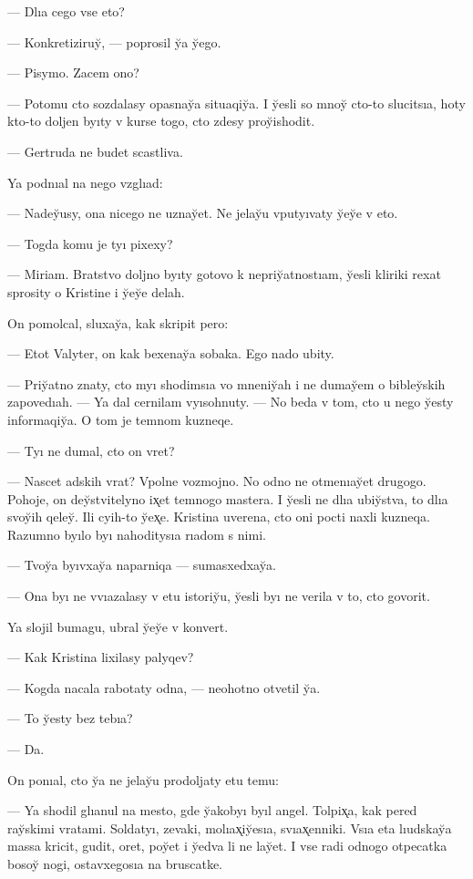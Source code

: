 \documentclass[10pt]{book}
\begin{document}
— Dlıa cego vse eto?

— Konkretiziruy̆, — poprosil y̆a y̆ego.

— Pisymo. Zacem ono?

— Potomu cto sozdalasy opasnay̆a situaqiy̆a. I y̆esli so mnoy̆ cto-to slucitsıa, hoty kto-to doljen byıty v kurse togo, cto zdesy proy̆ishodit.

— Gertruda ne budet scastliva.

Ya podnıal na nego vzglıad:

— Nadey̆usy, ona nicego ne uznay̆et. Ne jelay̆u vputyıvaty y̆ey̆e v eto.

— Togda komu je tyı pixexy?

— Miriam. Bratstvo doljno byıty gotovo k nepriy̆atnostıam, y̆esli kliriki rexat sprosity o Kristine i y̆ey̆e delah.

On pomolcal, sluxay̆a, kak skripit pero:

— Etot Valyter, on kak bexenay̆a sobaka. Ego nado ubity.

— Priy̆atno znaty, cto myı shodimsıa vo mneniy̆ah i ne dumay̆em o bibley̆skih zapovedıah. — Ya dal cernilam vyısohnuty. — No beda v tom, cto u nego y̆esty informaqiy̆a. O tom je temnom kuzneqe.

— Tyı ne dumal, cto on vret?

— Nascet adskih vrat? Vpolne vozmojno. No odno ne otmenıay̆et drugogo. Pohoje, on dey̆stvitelyno ix̨et temnogo mastera. I y̆esli ne dlıa ubiy̆stva, to dlıa svoy̆ih qeley̆. Ili cyih-to y̆ex̨e. Kristina uverena, cto oni pocti naxli kuzneqa. Razumno byılo byı nahoditysıa rıadom s nimi.

— Tvoy̆a byıvxay̆a naparniqa — sumasxedxay̆a.

— Ona byı ne vvıazalasy v etu istoriy̆u, y̆esli byı ne verila v to, cto govorit.

Ya slojil bumagu, ubral y̆ey̆e v konvert.

— Kak Kristina lixilasy palyqev?

— Kogda nacala rabotaty odna, — neohotno otvetil y̆a.

— To y̆esty bez tebıa?

— Da.

On ponıal, cto y̆a ne jelay̆u prodoljaty etu temu:

— Ya shodil glıanul na mesto, gde y̆akobyı byıl angel. Tolpix̨a, kak pered ray̆skimi vratami. Soldatyı, zevaki, molıax̨iy̆esıa, svıax̨enniki. Vsıa eta lıudskay̆a massa kricit, gudit, oret, poy̆et i y̆edva li ne lay̆et. I vse radi odnogo otpecatka bosoy̆ nogi, ostavxegosıa na bruscatke.
\end{document}
